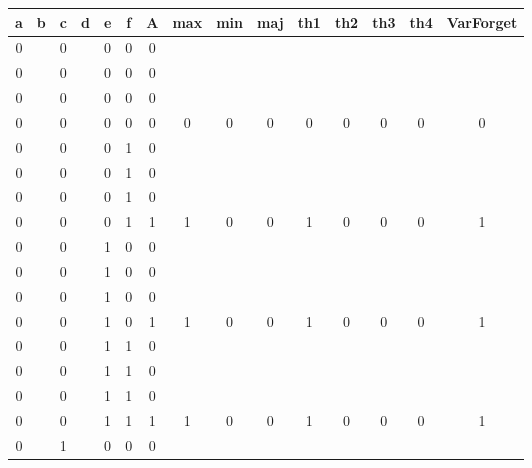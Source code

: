 \begin{table}[!tb]
    \centering
    \begin{tabular}{|c|c|c|c|c|c|c|c|c|c|c|c|c|c|c|}
        \hline
        \textbf{a} & \textbf{b} & \textbf{c} & \textbf{d} & \textbf{e} & \textbf{f} & \textbf{A} & \textbf{max} & \textbf{min} & \textbf{maj} & \textbf{th1} & \textbf{th2} & \textbf{th3} & \textbf{th4} & \textbf{VarForget} \\ \hline
        \rowcolor{gray!40} 0 &  & 0 &  & 0 & 0 & 0 &  &  &  &  &  &  &  &  \\ \hline
        \rowcolor{gray!40} 0 &  & 0 &  & 0 & 0 & 0 &  &  &  &  &  &  &  &  \\ \hline
        \rowcolor{gray!40} 0 &  & 0 &  & 0 & 0 & 0 &  &  &  &  &  &  &  &  \\ \hline
        \rowcolor{gray!40} 0 &  & 0 &  & 0 & 0 & 0 & 0 & 0 & 0 & 0 & 0 & 0 & 0 & 0 \\ \hline
        \rowcolor{blue!40} 0 &  & 0 &  & 0 & 1 & 0 &  &  &  &  &  &  &  &  \\ \hline
        \rowcolor{blue!40} 0 &  & 0 &  & 0 & 1 & 0 &  &  &  &  &  &  &  &  \\ \hline
        \rowcolor{blue!40} 0 &  & 0 &  & 0 & 1 & 0 &  &  &  &  &  &  &  &  \\ \hline
        \rowcolor{blue!40} 0 &  & 0 &  & 0 & 1 & 1 & 1 & 0 & 0 & 1 & 0 & 0 & 0 & 1 \\ \hline
        \rowcolor{red!40} 0 &  & 0 &  & 1 & 0 & 0 &  &  &  &  &  &  &  &  \\ \hline
        \rowcolor{red!40} 0 &  & 0 &  & 1 & 0 & 0 &  &  &  &  &  &  &  &  \\ \hline
        \rowcolor{red!40} 0 &  & 0 &  & 1 & 0 & 0 &  &  &  &  &  &  &  &  \\ \hline
        \rowcolor{red!40} 0 &  & 0 &  & 1 & 0 & 1 & 1 & 0 & 0 & 1 & 0 & 0 & 0 & 1 \\ \hline
        \rowcolor{green!40} 0 &  & 0 &  & 1 & 1 & 0 &  &  &  &  &  &  &  &  \\ \hline
        \rowcolor{green!40} 0 &  & 0 &  & 1 & 1 & 0 &  &  &  &  &  &  &  &  \\ \hline
        \rowcolor{green!40} 0 &  & 0 &  & 1 & 1 & 0 &  &  &  &  &  &  &  &  \\ \hline
        \rowcolor{green!40} 0 &  & 0 &  & 1 & 1 & 1 & 1 & 0 & 0 & 1 & 0 & 0 & 0 & 1 \\ \hline
        \rowcolor{yellow!40} 0 &  & 1 &  & 0 & 0 & 0 &  &  &  &  &  &  &  &  \\ \hline

\end{tabular}
\end{table}
